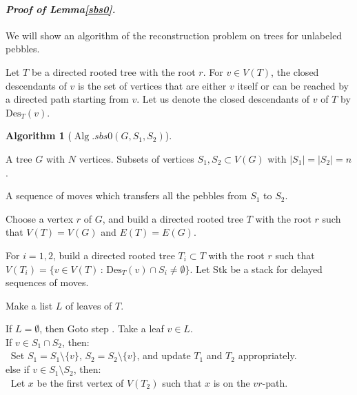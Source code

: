 \documentclass[letter,11pt]{article}
\newcommand{\white}{\qquad{\framebox{\rule{0pt}{4pt}}}}
\newcommand{\owari}{\hfill\white}
\theoremstyle{definition}
\theoremstyle{definition}
\newtheorem{alg}{Algorithm}
\DeclareMathOperator{\BT}{BT}
\DeclareMathOperator{\Alg}{Alg}
\DeclareMathOperator{\Pac}{Packing}
\DeclareMathOperator{\D}{D}
\newcommand{\1}{\boldmath$~1~$\unboldmath}
\newcommand{\Ord}{\mathrm{O}}
\newcommand{\qedgo}{\vspace{0.35cm}}
\newcommand{\tume}{\hspace*{0.2em}}
\newcommand{\maru}[1]{{\ooalign{\hfill$\small#1$\hfill\crcr\scalebox{1.3}{$\bigcirc$}}}}
\newenvironment{alg-enumerate}{%
  \begin{enumerate}%
   \renewcommand{\theenumi}{\arabic{enumi}}%
   \renewcommand{\labelenumi}{\rm{{\maru{\theenumi}}\tume\/}}%
   \renewcommand{\labelenumii}{\rm{$(${\maru{\theenumi}}-\theenumii$)$\tume\/}}%
 }{\end{enumerate}%
}
\newenvironment{Proofof}[1]{\expandafter
\paragraph{{\it Proof of #1.}}}{\hspace{5mm}\owari\qedgo}
\newcommand{\namelistlabel}[1]{\hspace*{10pt}\mbox{#1}:\hspace{\fill}}
\newenvironment{namelist}[1]{%
    \begin{list}{}
      {\let\makelabel\namelistlabel
      \settowidth{\labelwidth}{#1}
      \setlength{\leftmargin}{1.1\labelwidth}
      \setlength{\labelsep}{5pt}
      \setlength{\parsep}{0pt}}
  }{%
  \end{list}}
\begin{document}
\begin{Proofof}{Lemma\tume\ref{sbs0}}
We will show an algorithm of the reconstruction problem on trees for unlabeled pebbles.

Let $T$ be a directed rooted tree with the root $r$.
For $v \in V(T)$, the closed descendants of $v$ is the set of vertices that are either $v$ itself or can be reached by a directed path starting from $v$.
Let us denote the closed descendants of $v$ of $T$ by ${\textrm{Des}}_{T}(v)$. 

\begin{alg}[$\Alg.sbs0(G, S_1, S_2)$]\hfill
\begin{namelist}{OUTPUT}
\item[\sl Input]{A tree $G$ with $N$ vertices. Subsets of vertices $S_1, S_2  \subset V(G)$ with $|S_1| = |S_2| = n$. }
\item[\sl Output]{A sequence of moves which transfers all the pebbles from $S_1$ to $S_2$.}
\end{namelist}
\begin{alg-enumerate}
\item Choose a vertex $r$ of $G$, and build a directed rooted tree $T$ with the root $r$ such that $V(T)= V(G)$ and $E(T)=E(G)$.\label{sbs0_start0}
\item For $i=1,2$, build a directed rooted tree $T_i \subset T$ with the root $r$ such that $V(T_i) = \{ v \in V(T) \,:\, {\textrm{Des}}_{T}(v) \cap S_i \ne \emptyset \}$.
Let $\textrm{Stk}$ be a stack for delayed sequences of moves. 
\item Make a list $L$ of leaves of $T$. \label{sbs0_start1}
\item If $L = \emptyset$, then Goto step \maru{\ref{sbs0_pop}}.\label{sbs0_main}
Take a leaf $v \in L$.\\
If $v \in S_1 \cap S_2$, then:\\
$\ $ Set $S_1 = S_1 \setminus \{ v \}$, $S_2 = S_2 \setminus \{ v \}$, and update $T_1$ and $T_2$ appropriately.\\
else if $v \in S_1 \setminus S_2$, then:\\
$\ $ Let $x$ be the first vertex of $V(T_2)$ such that $x$ is on the $vr$-path.

\end{alg-enumerate}
\end{alg}
\end{Proofof}
\end{document}
